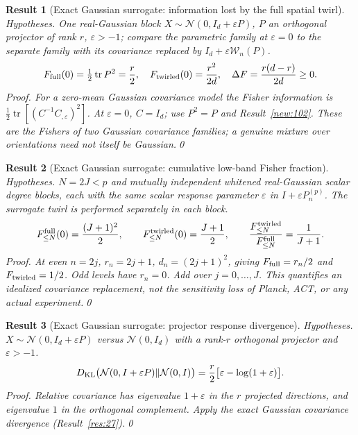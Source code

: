 \documentclass[aps,prd,onecolumn,notitlepage,groupedaddress,11pt]{revtex4-2}
\newtheorem{result}{Result}
\begin{document}
\begin{result}[\textsf{Exact Gaussian surrogate}: information lost by the full spatial twirl]\label{new:103}
\textit{Hypotheses.} One real-Gaussian block $X\sim\mathcal N(0,I_d+\varepsilon P)$, $P$ an orthogonal projector of rank $r$, $\varepsilon>-1$; compare the parametric family at $\varepsilon=0$ to the separate family with its covariance replaced by $I_d+\varepsilon\mathcal W_n(P)$.
\begin{equation}\label{new:eq103}
F_{\rm full}(0)=\tfrac12\operatorname{tr}P^2=\frac r2,
\quad F_{\rm twirled}(0)=\frac{r^2}{2d},\quad
\Delta F=\frac{r(d-r)}{2d}\ge0.
\end{equation}
\textit{Proof.} For a zero-mean Gaussian covariance model the Fisher information is $\tfrac12\operatorname{tr}[(C^{-1}C_{,\varepsilon})^2]$. At $\varepsilon=0$, $C=I_d$; use $P^2=P$ and Result~\ref{new:102}. These are the Fishers of \emph{two Gaussian covariance families}; a genuine mixture over orientations need not itself be Gaussian.\qed
\end{result}

\begin{result}[\textsf{Exact Gaussian surrogate}: cumulative low-band Fisher fraction]\label{new:104}
\textit{Hypotheses.} $N=2J<p$ and mutually independent whitened real-Gaussian scalar degree blocks, each with the same scalar response parameter $\varepsilon$ in $I+\varepsilon P_n^{(p)}$. The surrogate twirl is performed separately in each block.
\begin{equation}\label{new:eq104}
F_{\le N}^{\rm full}(0)=\frac{(J+1)^2}{2},\qquad
F_{\le N}^{\rm twirled}(0)=\frac{J+1}{2},\qquad
\frac{F_{\le N}^{\rm twirled}}{F_{\le N}^{\rm full}}=\frac1{J+1}.
\end{equation}
\textit{Proof.} At even $n=2j$, $r_n=2j+1$, $d_n=(2j+1)^2$, giving $F_{\rm full}=r_n/2$ and $F_{\rm twirled}=1/2$. Odd levels have $r_n=0$. Add over $j=0,\ldots,J$. This quantifies an idealized covariance replacement, not the sensitivity loss of Planck, ACT, or any actual experiment.\qed
\end{result}

\begin{result}[\textsf{Exact Gaussian surrogate}: projector response divergence]\label{new:105}
\textit{Hypotheses.} $X\sim\mathcal N(0,I_d+\varepsilon P)$ versus $\mathcal N(0,I_d)$ with a rank-$r$ orthogonal projector and $\varepsilon>-1$.
\begin{equation}\label{new:eq105}
D_{\rm KL}\bigl(\mathcal N(0,I+\varepsilon P)\Vert\mathcal N(0,I)\bigr)
=\frac r2\bigl[\varepsilon-\log(1+\varepsilon)\bigr].
\end{equation}
\textit{Proof.} Relative covariance has eigenvalue $1+\varepsilon$ in the $r$ projected directions, and eigenvalue $1$ in the orthogonal complement. Apply the exact Gaussian covariance divergence (Result~\ref{res:27}).\qed
\end{result}
\end{document}
